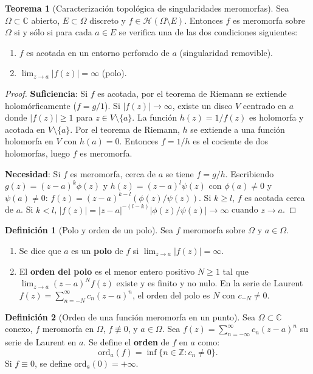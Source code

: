 \documentclass[11pt,a4paper]{article}
\theoremstyle{definition}
\newtheorem{definicion}{Definición}[section]
\newtheorem{teorema}{Teorema}[section]
\theoremstyle{remark}
\numberwithin{equation}{section}
\begin{document}
\begin{teorema}[Caracterización topológica de singularidades meromorfas]
Sea $\Omega \subset \mathbb{C}$ abierto, $E \subset \Omega$ discreto y $f \in \mathcal{H}(\Omega \setminus E)$. Entonces $f$ es meromorfa sobre $\Omega$ si y sólo si para cada $a \in E$ se verifica una de las dos condiciones siguientes:
\begin{enumerate}
\item $f$ es acotada en un entorno perforado de $a$ (singularidad removible).
\item $\lim_{z \to a} |f(z)| = \infty$ (polo).
\end{enumerate}
\end{teorema}
\begin{proof}
\textbf{Suficiencia}: Si $f$ es acotada, por el teorema de Riemann se extiende holomórficamente ($f = g/1$). Si $|f(z)| \to \infty$, existe un disco $V$ centrado en $a$ donde $|f(z)| \ge 1$ para $z \in V \setminus \{a\}$. La función $h(z) = 1/f(z)$ es holomorfa y acotada en $V \setminus \{a\}$. Por el teorema de Riemann, $h$ se extiende a una función holomorfa en $V$ con $h(a) = 0$. Entonces $f = 1/h$ es el cociente de dos holomorfas, luego $f$ es meromorfa.

\textbf{Necesidad}: Si $f$ es meromorfa, cerca de $a$ se tiene $f = g/h$. Escribiendo $g(z) = (z-a)^k \phi(z)$ y $h(z) = (z-a)^l \psi(z)$ con $\phi(a) \neq 0$ y $\psi(a) \neq 0$: $f(z) = (z-a)^{k-l} (\phi(z)/\psi(z))$. Si $k \ge l$, $f$ es acotada cerca de $a$. Si $k < l$, $|f(z)| = |z-a|^{-(l-k)} |\phi(z)/\psi(z)| \to \infty$ cuando $z \to a$.
\end{proof}

\begin{definicion}[Polo y orden de un polo]
Sea $f$ meromorfa sobre $\Omega$ y $a \in \Omega$.
\begin{enumerate}
\item Se dice que $a$ es un \textbf{polo} de $f$ si $\lim_{z \to a} |f(z)| = \infty$.
\item El \textbf{orden del polo} es el menor entero positivo $N \ge 1$ tal que $\lim_{z \to a} (z-a)^N f(z)$ existe y es finito y no nulo. En la serie de Laurent $f(z) = \sum_{n=-N}^\infty c_n (z-a)^n$, el orden del polo es $N$ con $c_{-N} \neq 0$.
\end{enumerate}
\end{definicion}

\begin{definicion}[Orden de una función meromorfa en un punto]
Sea $\Omega \subset \mathbb{C}$ conexo, $f$ meromorfa en $\Omega$, $f \not\equiv 0$, y $a \in \Omega$. Sea $f(z) = \sum_{n=-\infty}^\infty c_n (z-a)^n$ su serie de Laurent en $a$. Se define el \textbf{orden} de $f$ en $a$ como:
\begin{equation}
\mathrm{ord}_a(f) = \inf\{n \in \mathbb{Z} : c_n \neq 0\}.
\end{equation}
Si $f \equiv 0$, se define $\mathrm{ord}_a(0) = +\infty$.
\end{definicion}
\end{document}
